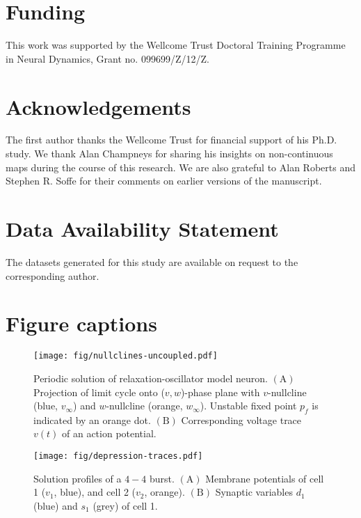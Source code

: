 \documentclass[utf8,draft]{frontiersFPHY} %
\begin{document}
\section*{Funding}
This work was supported by the Wellcome Trust Doctoral Training Programme in Neural Dynamics, Grant no. 099699/Z/12/Z.

\section*{Acknowledgements}
The first author thanks the Wellcome Trust for financial support of his Ph.D. study.
We thank Alan Champneys for sharing his insights on non-continuous maps during the course of this research.
We are also grateful to Alan Roberts and Stephen R. Soffe for their comments on earlier versions of the manuscript.

\section*{Data Availability Statement}
The datasets generated for this study are available on request to the corresponding author.




\section*{Figure captions}

\begin{figure}[h!]
  \centering
  \texttt{[image: fig/nullclines-uncoupled.pdf]}
  \caption{Periodic solution of relaxation-oscillator model neuron. $\bm{\mathrm{(A)}}$ Projection of limit cycle onto ($v,w$)-phase plane with $v$-nullcline (blue, $v_\infty$) and $w$-nullcline (orange, $w_\infty$). Unstable fixed point $p_{f}$ is indicated by an orange dot. $\bm{\mathrm{(B)}}$ Corresponding voltage trace $v(t)$ of an action potential.~\label{fig:nullclines}}
\end{figure}

\begin{figure}[h!]
  \centering
  \texttt{[image: fig/depression-traces.pdf]}
  \caption{Solution profiles of a $4-4$ burst. $\bm{\mathrm{(A)}}$ Membrane potentials of cell 1 ($v_{1}$, blue), and cell 2 ($v_{2}$, orange). $\bm{\mathrm{(B)}}$ Synaptic variables $d_{1}$ (blue) and $s_{1}$ (grey) of cell 1.~\label{fig:depression-traces}}
\end{figure}
\end{document}

